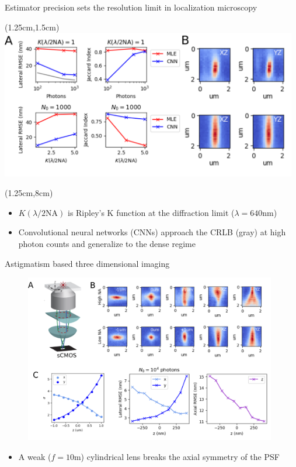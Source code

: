 \documentclass{beamer}					%
\begin{document}
\begin{frame}{Estimator precision sets the resolution limit in localization microscopy}

\begin{textblock*}{13cm}(1.25cm,1.5cm)
\includegraphics[width=13cm]{PSF2D.png}
\end{textblock*}
\begin{textblock*}{13cm}(1.25cm,8cm)
\begin{itemize}
\item $K(\lambda/2\mathrm{NA})$ is Ripley's K function at the diffraction limit ($\lambda=640\mathrm{nm}$)
\item Convolutional neural networks (CNNs) approach the CRLB (gray) at high photon counts and generalize to the dense regime
\end{itemize}
\end{textblock*}

\end{frame}


\begin{frame}{Astigmatism based three dimensional imaging}
\begin{figure}
\includegraphics[width=11cm]{Astigmatism.png}
\end{figure}
\begin{itemize}
\item A weak ($f=10$m) cylindrical lens breaks the axial symmetry of the PSF
\end{itemize}
\end{frame}
\end{document}
